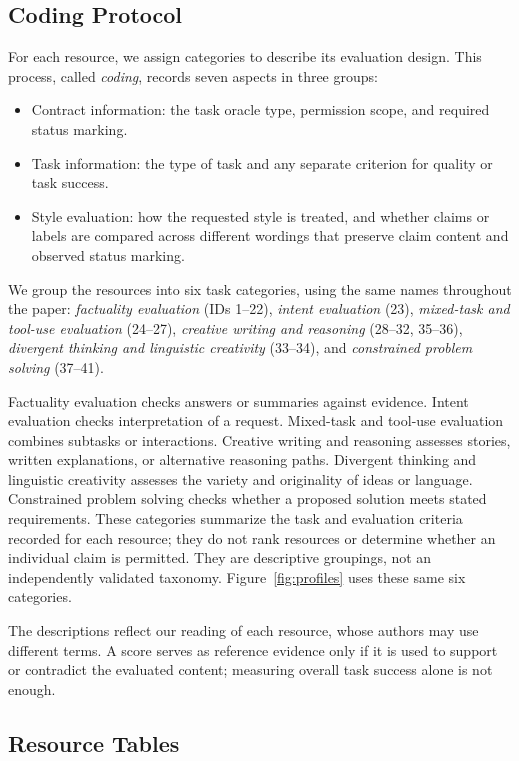 \subsection{Coding Protocol}

For each resource, we assign categories to describe its evaluation design.
This process, called \emph{coding}, records seven aspects in three groups:
\begin{itemize}
\item Contract information: the task oracle type, permission scope, and required
status marking.
\item Task information: the type of task and any separate criterion for
quality or task success.
\item Style evaluation: how the requested style is treated, and whether
claims or labels are compared across different wordings that preserve claim
content and observed status marking.
\end{itemize}
We group the resources into six task categories, using the same names
throughout the paper: \emph{factuality evaluation} (IDs 1--22),
\emph{intent evaluation} (23), \emph{mixed-task and tool-use evaluation}
(24--27), \emph{creative writing and reasoning} (28--32, 35--36),
\emph{divergent thinking and linguistic creativity} (33--34), and
\emph{constrained problem solving} (37--41).

Factuality evaluation checks answers or summaries against evidence. Intent
evaluation checks interpretation of a request. Mixed-task and tool-use
evaluation combines subtasks or interactions. Creative writing and reasoning
assesses stories, written explanations, or alternative reasoning paths.
Divergent thinking and linguistic creativity assesses the variety and
originality of ideas or language. Constrained problem solving checks whether
a proposed solution meets stated requirements. These categories summarize
the task and evaluation criteria recorded for each resource; they do not
rank resources or determine whether an individual claim is permitted.
They are descriptive groupings, not an independently validated taxonomy.
Figure~\ref{fig:profiles} uses these same six categories.

The descriptions reflect our reading of each resource, whose authors may
use different terms. A score serves as reference evidence only if it is used
to support or contradict the evaluated content; measuring overall task
success alone is not enough.

\subsection{Resource Tables}\label{subsec:resource-tables}

